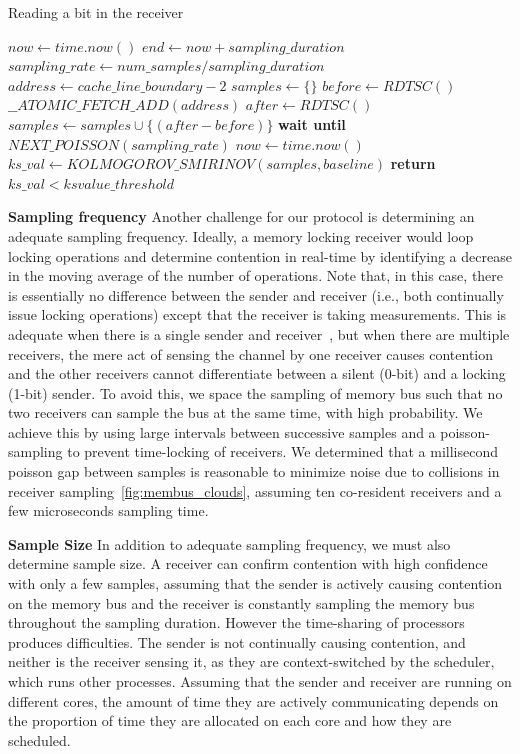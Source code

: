 \begin{algorithm}[!t]
\caption{Reading a bit in the receiver}
\label{alg:receiver}
\begin{algorithmic}[1]
\STATE $now \leftarrow  time.now()$
\STATE $end \leftarrow now + sampling\_duration$
\STATE $sampling\_rate \leftarrow num\_samples / sampling\_duration$
\STATE $address \leftarrow cache\_line\_boundary-2$
\STATE $samples \leftarrow \{\} $
    \STATE $before \leftarrow RDTSC()$
    \STATE $\_\_ATOMIC\_FETCH\_ADD(address)$
    \STATE $after \leftarrow RDTSC()$
    \STATE $samples \leftarrow samples \cup \{(after-before)\}$
    \STATE \textbf{wait until} $NEXT\_POISSON(sampling\_rate)$
    \STATE $now \leftarrow  time.now()$
\ENDWHILE
\STATE $ks\_val \leftarrow KOLMOGOROV\_SMIRINOV(samples, baseline)$
\STATE \textbf{return} $ks\_val < ksvalue\_threshold$
\end{algorithmic}
\end{algorithm}


\textbf{Sampling frequency}
\label{sec:method:listen:freq}
Another challenge for our protocol is determining an adequate sampling
frequency. Ideally, a memory locking receiver would loop locking operations and
determine contention in real-time by identifying a decrease in the moving
average of the number of operations. Note that, in this case, there is
essentially no difference between the sender and receiver (i.e., both
continually issue locking operations) except that the receiver is taking
measurements. This is adequate when there is a single sender and
receiver~\cite{varadarajan2015}, but when there are multiple receivers, the mere
act of sensing the channel by one receiver causes contention and the other receivers
cannot differentiate between a silent (0-bit) and a locking (1-bit) sender. To
avoid this, we space the sampling of memory bus such that no two receivers can 
sample the bus at the same time, with high probability. We achieve this by
using large intervals between successive samples and a poisson-sampling to
prevent time-locking of receivers. We determined that a millisecond poisson gap
between samples is reasonable to minimize noise due to collisions in receiver
sampling~\ref{fig:membus_clouds}, assuming ten co-resident receivers and a few
microseconds sampling time. 

\textbf{Sample Size} 
\label{sec:method:samplingdur}
In addition to adequate sampling frequency, we must also determine sample size.  
A receiver can confirm contention with high confidence with only a
few samples, assuming that the sender is actively causing contention on the
memory bus and the receiver is constantly sampling the memory bus throughout the
sampling duration. However the time-sharing of processors
produces difficulties. The sender is not continually causing contention, and
neither is the receiver sensing it, as they are context-switched by the
scheduler, which runs other processes. Assuming that the sender and receiver are
running on different cores, the amount of time they are actively communicating
depends on the proportion of time they are allocated on each core and how they
are scheduled. 

